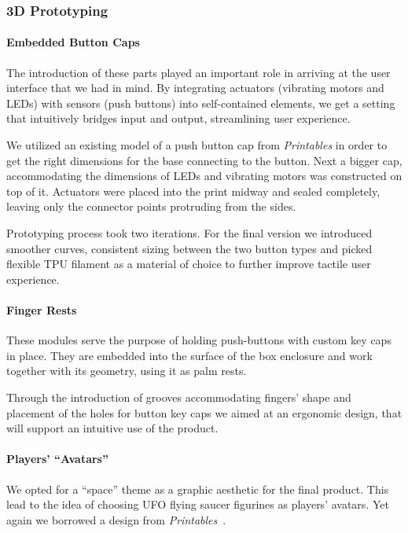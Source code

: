 \documentclass[acmsmall]{acmart}
\begin{document}
\subsubsection{3D Prototyping}

\paragraph{Embedded Button Caps}
The introduction of these parts played an important role in arriving at the user interface that we had in mind. By integrating actuators (vibrating motors and LEDs) with sensors (push buttons) into self-contained elements, we get a setting that intuitively bridges input and output, streamlining user experience.

We utilized an existing model of a push button cap from \textit{Printables}\cite{tactile_switch_cap_12x12} in order to get the right dimensions for the base connecting to the button. Next a bigger cap, accommodating the dimensions of LEDs and vibrating motors was constructed on top of it. Actuators were placed into the print midway and sealed completely, leaving only the connector points protruding from the sides.

Prototyping process took two iterations. For the final version we introduced smoother curves, consistent sizing between the two button types and picked flexible TPU filament as a material of choice to further improve tactile user experience.


\paragraph{Finger Rests}

These modules serve the purpose of holding push-buttons with custom key caps in place. They are embedded into the surface of the box enclosure and work together with its geometry, using it as palm rests.

Through the introduction of grooves accommodating fingers' shape and placement of the holes for button key caps we aimed at an ergonomic design, that will support an intuitive use of the product.


\paragraph{Players' ``Avatars''}

We opted for a ``space'' theme as a graphic aesthetic for the final product. This lead to the idea of choosing UFO flying saucer figurines as players' avatars. Yet again we borrowed a design from \textit{Printables}~\cite{alien_ufo_alext_2024}.
\end{document}
